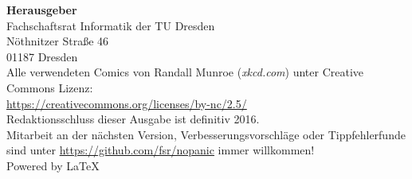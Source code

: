 \newpage
\thispagestyle{empty} %
\color{white}

\begin{minipage}[t][\textheight][b]{.70\textwidth}
\footnotesize
\textbf{Herausgeber} \\
Fachschaftsrat Informatik der TU Dresden\\
Nöthnitzer Straße 46\\
01187 Dresden\\

Alle verwendeten Comics von Randall Munroe (\textit{xkcd.com}) unter Creative Commons Lizenz:\\
\url{https://creativecommons.org/licenses/by-nc/2.5/}\\

Redaktionsschluss dieser Ausgabe ist definitiv 2016.\\

Mitarbeit an der nächsten Version, Verbesserungsvorschläge oder Tippfehlerfunde sind unter \url{https://github.com/fsr/nopanic} immer willkommen!\\

Powered by \LaTeX
\end{minipage}%
\hspace{.13\textwidth}%
